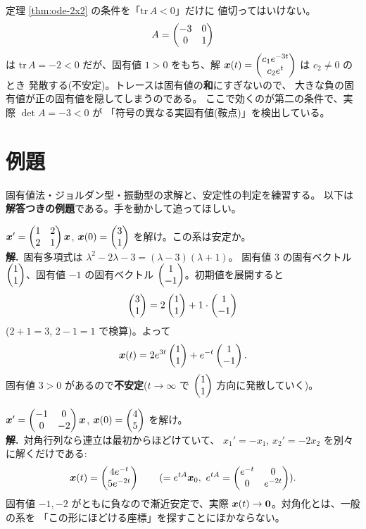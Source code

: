 \begin{hanrei}[トレースが負というだけでは安定といえない]\label{hanrei:ode-trace}
定理 \ref{thm:ode-2x2} の条件を「$\mathrm{tr}\,A < 0$」だけに
値切ってはいけない。
\[
A = \begin{pmatrix}-3 & 0 \\ 0 & 1\end{pmatrix}
\]
は $\mathrm{tr}\,A = -2 < 0$ だが、固有値 $1 > 0$ をもち、解
$\bm{x}(t) = \begin{pmatrix}c_1 e^{-3t} \\ c_2 e^{t}\end{pmatrix}$ は $c_2 \neq 0$ のとき
発散する(不安定)。トレースは固有値の\textbf{和}にすぎないので、
大きな負の固有値が正の固有値を隠してしまうのである。
ここで効くのが第二の条件で、実際 $\det A = -3 < 0$ が
「符号の異なる実固有値(鞍点)」を検出している。
\end{hanrei}

\section{例題}

固有値法・ジョルダン型・振動型の求解と、安定性の判定を練習する。
以下は\textbf{解答つきの例題}である。手を動かして追ってほしい。

\begin{rei}[例題・基本(固有値法)]\label{rei:ode-basic}
$\bm{x}' = \begin{pmatrix}1 & 2 \\ 2 & 1\end{pmatrix}\bm{x}$,
$\bm{x}(0) = \begin{pmatrix}3 \\ 1\end{pmatrix}$ を解け。この系は安定か。\\
\textbf{解.}\ 固有多項式は $\lambda^2 - 2\lambda - 3 = (\lambda - 3)(\lambda + 1)$。
固有値 $3$ の固有ベクトル $\begin{pmatrix}1 \\ 1\end{pmatrix}$、固有値 $-1$ の固有ベクトル
$\begin{pmatrix}1 \\ -1\end{pmatrix}$。初期値を展開すると
\[
\begin{pmatrix}3 \\ 1\end{pmatrix} = 2\begin{pmatrix}1 \\ 1\end{pmatrix} + 1 \cdot \begin{pmatrix}1 \\ -1\end{pmatrix}
\]
($2 + 1 = 3$, $2 - 1 = 1$ で検算)。よって
\[
\bm{x}(t) = 2e^{3t}\begin{pmatrix}1 \\ 1\end{pmatrix} + e^{-t}\begin{pmatrix}1 \\ -1\end{pmatrix}.
\]
固有値 $3 > 0$ があるので\textbf{不安定}($t \to \infty$ で
$\begin{pmatrix}1 \\ 1\end{pmatrix}$ 方向に発散していく)。
\end{rei}

\begin{rei}[例題・基本(絡み合いのない系)]\label{rei:ode-decoupled}
$\bm{x}' = \begin{pmatrix}-1 & 0 \\ 0 & -2\end{pmatrix}\bm{x}$,
$\bm{x}(0) = \begin{pmatrix}4 \\ 5\end{pmatrix}$ を解け。\\
\textbf{解.}\ 対角行列なら連立は最初からほどけていて、
$x_1' = -x_1$, $x_2' = -2x_2$ を別々に解くだけである:
\[
\bm{x}(t) = \begin{pmatrix}4e^{-t} \\ 5e^{-2t}\end{pmatrix}
\qquad (= e^{tA}\bm{x}_0,\ e^{tA} = \begin{pmatrix}e^{-t} & 0 \\ 0 & e^{-2t}\end{pmatrix}).
\]
固有値 $-1, -2$ がともに負なので漸近安定で、実際
$\bm{x}(t) \to \bm{0}$。対角化とは、一般の系を
「この形にほどける座標」を探すことにほかならない。
\end{rei}

